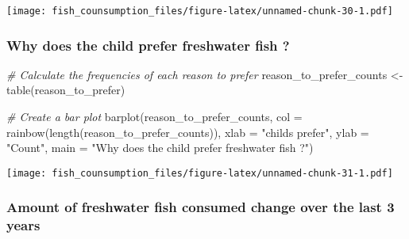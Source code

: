 \documentclass[
]{article}
\newenvironment{Shaded}{\begin{snugshade}}{\end{snugshade}}
\newcommand{\AttributeTok}[1]{\textcolor[rgb]{0.77,0.63,0.00}{#1}}
\newcommand{\CommentTok}[1]{\textcolor[rgb]{0.56,0.35,0.01}{\textit{#1}}}
\newcommand{\FunctionTok}[1]{\textcolor[rgb]{0.00,0.00,0.00}{#1}}
\newcommand{\NormalTok}[1]{#1}
\newcommand{\OtherTok}[1]{\textcolor[rgb]{0.56,0.35,0.01}{#1}}
\newcommand{\SpecialCharTok}[1]{\textcolor[rgb]{0.00,0.00,0.00}{#1}}
\newcommand{\StringTok}[1]{\textcolor[rgb]{0.31,0.60,0.02}{#1}}
\begin{document}
\begin{Shaded}
\end{Shaded}

\texttt{[image: fish\_counsumption\_files/figure-latex/unnamed-chunk-30-1.pdf]}

\hypertarget{why-does-the-child-prefer-freshwater-fish}{%
\subsubsection{Why does the child prefer freshwater fish
?}\label{why-does-the-child-prefer-freshwater-fish}}

\begin{Shaded}
\begin{Highlighting}[]
\CommentTok{\# Calculate the frequencies of each reason to prefer}
\NormalTok{reason\_to\_prefer\_counts }\OtherTok{\textless{}{-}} \FunctionTok{table}\NormalTok{(reason\_to\_prefer)}

\CommentTok{\# Create a bar plot}
\FunctionTok{barplot}\NormalTok{(reason\_to\_prefer\_counts, }\AttributeTok{col =} \FunctionTok{rainbow}\NormalTok{(}\FunctionTok{length}\NormalTok{(reason\_to\_prefer\_counts)), }
        \AttributeTok{xlab =} \StringTok{"child\textquotesingle{}s prefer"}\NormalTok{, }\AttributeTok{ylab =} \StringTok{"Count"}\NormalTok{, }\AttributeTok{main =} \StringTok{"Why does the child prefer freshwater fish ?"}\NormalTok{)}
\end{Highlighting}
\end{Shaded}

\texttt{[image: fish\_counsumption\_files/figure-latex/unnamed-chunk-31-1.pdf]}

\hypertarget{amount-of-freshwater-fish-consumed-change-over-the-last-3-years}{%
\subsubsection{Amount of freshwater fish consumed change over the last 3
years}\label{amount-of-freshwater-fish-consumed-change-over-the-last-3-years}}
\end{document}
